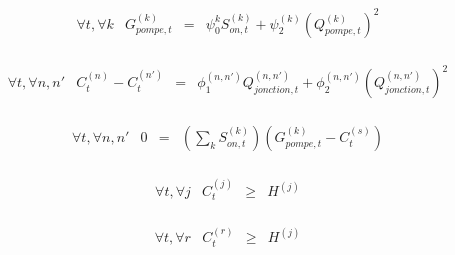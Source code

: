 \documentclass{article}
\begin{document}
\begin{equation}
    \tag{Gain charge pompe}
    \left.
        \begin{array}{lccc}
            \forall t, \forall k   &   G_{pompe,t}^{(k)}     & = &   \psi_0^{k}S_{on,t}^{(k)} + \psi_2^{(k)}(Q_{pompe,t}^{(k)})^2\\[0.2cm]
        \end{array}
    \right.
\end{equation}

\begin{equation}
    \tag{Perte charge flux}
    \left.
        \begin{array}{lcccc}
            \forall t, \forall n,n'   &   C_t^{(n)}  - C_t^{(n')}    & = &   \phi_1^{(n,n')}Q_{jonction,t}^{(n,n')} + \phi_2^{(n,n')}(Q_{jonction,t}^{(n,n')})^2\\[0.2cm]
        \end{array}
    \right.
\end{equation}

\begin{equation}
    \tag{Charge source}
    \left.
        \begin{array}{lcccc}
            \forall t, \forall n,n'   &   0 & = & (\sum_k S_{on,t}^{(k)})    (G_{pompe,t}^{(k)}-C_t^{(s)})\\[0.2cm]
        \end{array}
    \right.
\end{equation}

\begin{equation}
    \tag{Charge jonction}
    \left.
        \begin{array}{lcccc}
            \forall t, \forall j   &   C_t^{(j)}    & \geq &   H^{(j)}\\[0.2cm]
        \end{array}
    \right.
\end{equation}

\begin{equation}
    \tag{Charge réservoire}
    \left.
        \begin{array}{lcccc}
            \forall t, \forall r   &   C_t^{(r)}    & \geq &   H^{(j)}\\[0.2cm]
        \end{array}
    \right.
\end{equation}
    
\end{document}
